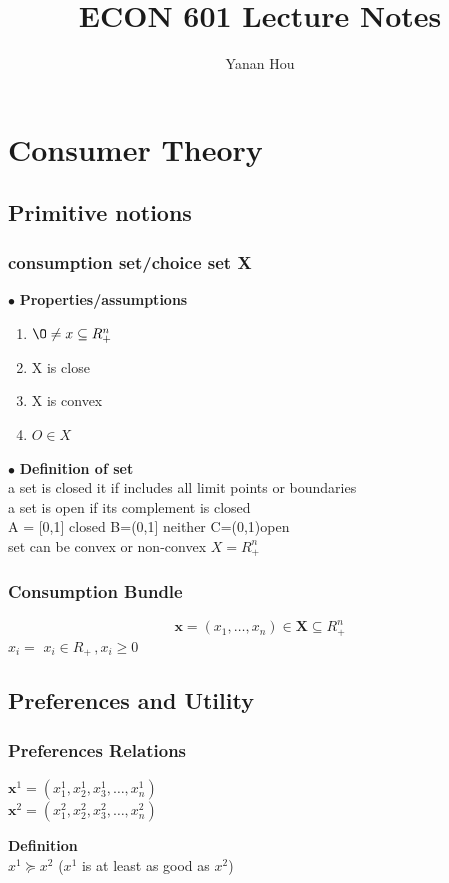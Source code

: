\documentclass[letterpaper,13pt,single,pdftex]{scrartcl}
\title{ECON 601 Lecture Notes}
\author{Yanan Hou}
\begin{document}
 


\section{ Consumer Theory}
\subsection{Primitive notions}
\subsubsection{consumption set/choice set X}
$\bullet$ \textbf{Properties/assumptions}
\begin{enumerate}
    \item 
    $\O \ne x \subseteq R^n_+$
    \item
X is close
\item
X is convex
\item
$O \in X$
\end{enumerate}

$\bullet$ \textbf{Definition of set}\\
a set is closed it if includes all limit points or boundaries\\
a set is open if its complement is closed \\
A = [0,1]  closed  \quad B=(0,1] neither \quad C=(0,1)open\\
set can be convex or non-convex  \quad $X = R^n_+$
\subsubsection{Consumption Bundle}
 \[ \textbf{x} = (x_1,\dots,x_n) \in \textbf{X} \subseteq R^n_+ \]
 $x_i =$ \quad  $x_i \in R_+\,, x_i \ge  0$
\subsection{Preferences and Utility}
\subsubsection{Preferences Relations}
 $ \textbf{x}^1 = (x^1_1,x^1_2,x^1_3,\dots,x^1_n)$ \\$\textbf{x}^2 = (x^2_1,x^2_2,x^2_3,\dots,x^2_n)$
\par \textbf{Definition}\\
 $x^1 \succeq x^2 $ 
 ($x^1$ is at least as good as $x^2$)
\end{document}
